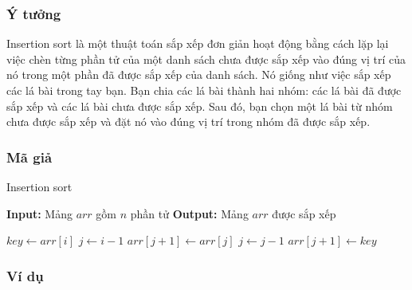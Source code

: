 \subsubsection{Ý tưởng}
Insertion sort là một thuật toán sắp xếp đơn giản hoạt động bằng cách lặp lại việc chèn từng phần tử của một danh sách chưa được sắp xếp vào đúng vị trí của nó trong một phần đã được sắp xếp của danh sách. Nó giống như việc sắp xếp các lá bài trong tay bạn. Bạn chia các lá bài thành hai nhóm: các lá bài đã được sắp xếp và các lá bài chưa được sắp xếp. Sau đó, bạn chọn một lá bài từ nhóm chưa được sắp xếp và đặt nó vào đúng vị trí trong nhóm đã được sắp xếp.
\subsubsection{Mã giả}

\begin{algorithm}[H]
\caption{Insertion sort}
\begin{algorithmic}[1]
    \State \textbf{Input:} Mảng $arr$ gồm $n$ phần tử
    \State \textbf{Output:} Mảng $arr$ được sắp xếp
    
    \State $key \gets arr[i]$
    \State $j \gets i - 1$
        \State $arr[j+1] \gets arr[j]$
        \State $j \gets j - 1$
    \EndWhile
    \State $arr[j+1] \gets key$
\EndFor
\EndProcedure
\end{algorithmic}
\end{algorithm}

\subsubsection{Ví dụ}

